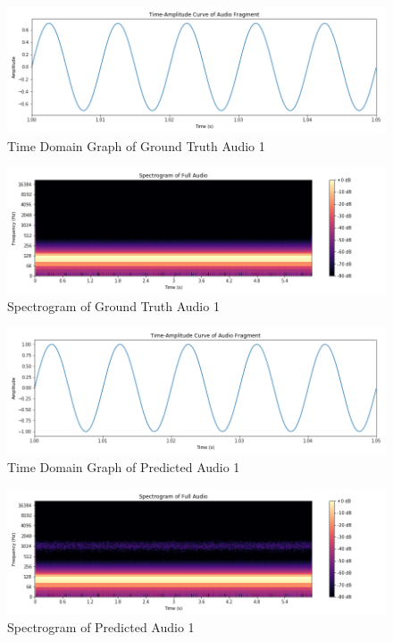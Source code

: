 \documentclass{ioereport}
\begin{document}
    \begin{figure}[H]
        \centering
        \includegraphics[width=\linewidth]{assets/audio_results/puretone100hztime.png}
        \caption{Time Domain Graph of Ground Truth Audio 1}
        \label{fig:gt-pure100-time}
    \end{figure}
    \begin{figure}[H]
        \centering
        \includegraphics[width=\linewidth]{assets/audio_results/puretone100hzspec.png}
        \caption{Spectrogram of Ground Truth Audio 1}
        \label{fig:gt-pure100-spec}
    \end{figure}
    
    \begin{figure}[H]
        \centering
        \includegraphics[width=\linewidth]{assets/audio_results/predpuretone100hztime.png}
        \caption{Time Domain Graph of Predicted Audio 1}
        \label{fig:pred-pure100-time}
    \end{figure}
    \begin{figure}[H]
        \centering
        \includegraphics[width=\linewidth]{assets/audio_results/predpuretone100hzspec.png}
        \caption{Spectrogram of Predicted Audio 1}
        \label{fig:pred-pure100-spec}
    \end{figure}
\end{document}
